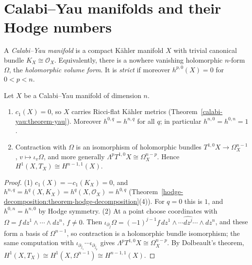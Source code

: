 \section{Calabi--Yau manifolds and their Hodge numbers}\label{calabi-yau:section-definition}

\begin{definition}\label{calabi-yau:definition-calabi-yau}
A \emph{Calabi--Yau manifold} is a compact K\"ahler manifold $X$ with trivial canonical bundle $K_X \cong \mathcal{O}_X$. Equivalently, there is a nowhere vanishing holomorphic
$n$-form $\Omega$, the \emph{holomorphic volume form}. It is \emph{strict} if moreover $h^{p,0}(X) = 0$ for $0 < p < n$.
\end{definition}

\begin{proposition}\label{calabi-yau:proposition-basic}
Let $X$ be a Calabi--Yau manifold of dimension $n$.
\begin{enumerate}
\item $c_1(X) = 0$, so $X$ carries Ricci-flat K\"ahler metrics (Theorem~\ref{calabi-yau:theorem-yau}). Moreover $h^{0,q} = h^{n,q}$ for all $q$; in particular
$h^{n,0} = h^{0,n} = 1$.
\item Contraction with $\Omega$ is an isomorphism of holomorphic bundles $T^{1,0}X \to \Omega^{n-1}_X$, $v \mapsto \iota_v\Omega$, and more generally
$\Lambda^pT^{1,0}X \cong \Omega^{n-p}_X$. Hence $H^1(X, T_X) \cong H^{n-1,1}(X)$.
\end{enumerate}
\end{proposition}

\begin{proof}
(1) $c_1(X) = -c_1(K_X) = 0$, and $h^{n,q} = h^q(X, K_X) = h^q(X, \mathcal{O}_X) = h^{0,q}$ (Theorem~\ref{hodge-decomposition:theorem-hodge-decomposition}(4)). For $q = 0$ this is
$1$, and $h^{0,n} = h^{n,0}$ by Hodge symmetry. (2) At a point choose coordinates with $\Omega = f\,dz^1 \wedge \cdots \wedge dz^n$, $f \neq 0$. Then $\iota_{\partial_j}\Omega = (-1)^{j-1}f\,dz^1 \wedge \cdots \widehat{dz^j} \cdots \wedge dz^n$,
and these form a basis of $\Omega^{n-1}$, so contraction is a holomorphic bundle isomorphism; the same computation with $\iota_{\partial_{j_1}} \cdots \iota_{\partial_{j_p}}$
gives $\Lambda^pT^{1,0}X \cong \Omega^{n-p}_X$. By Dolbeault's theorem, $H^1(X, T_X) \cong H^1(X, \Omega^{n-1}) \cong H^{n-1,1}(X)$.
\end{proof}

